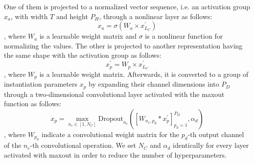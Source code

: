 \documentclass[review]{elsarticle}
\begin{document}
One of them is projected to a normalized vector sequence, i.e. an activation group $x_a$, with width $T$ and height $P_H$, through a nonlinear layer as follows:
\begin{equation}
x_a=\sigma(W_{a} \times x^\prime_{L_C})
\label{eq:nonlinear}
\end{equation}
, where \(W_a\) is a learnable weight matrix and \(\sigma\) is a nonlinear function for normalizing the values.
The other is projected to another representation having the same shape with the activation group as follows:
\begin{equation}
x_p^\prime=W_{p} \times x^\prime_{L_C}
\label{eq:linear}
\end{equation}
, where \(W_p\) is a learnable weight matrix.
Afterwards, it is converted to a group of instantiation parameters \(x_p\) by expanding their channel dimensions into \(P_D\) through a two-dimensional convolutional layer activated with the maxout function as follows:
\begin{equation}
x_p=\max_{n_c\in[1, N_C]}\text{Dropout}_{n_c}([W_{n_c, p_d} * x_p^\prime]_{p_d=1}^{P_D}, \alpha_d)
\label{eq:maxout2}
\end{equation}
, where $W_{p_d}$ indicate a convolutional weight matrix for the $p_d$-th output channel of the $n_c$-th convolutional operation.
We set $N_C$ and $\alpha_d$ identically for every layer activated with maxout in order to reduce the number of hyperparameters.
\end{document}
